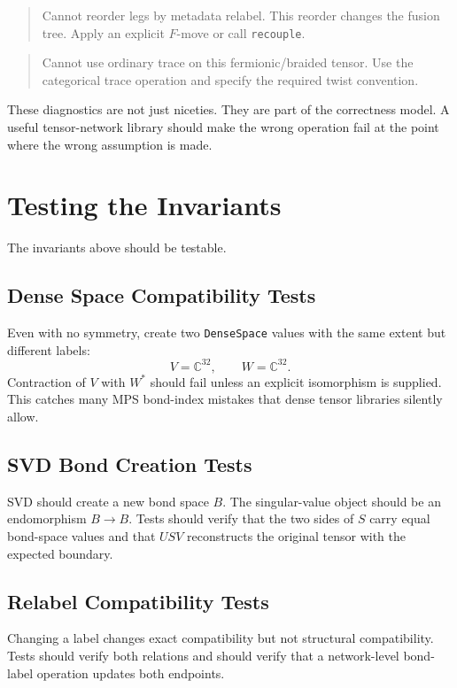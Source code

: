 \documentclass[11pt]{article}
\begin{document}
\begin{quote}
Cannot reorder legs by metadata relabel.  This reorder changes the
fusion tree.  Apply an explicit \(F\)-move or call \texttt{recouple}.
\end{quote}

\begin{quote}
Cannot use ordinary trace on this fermionic/braided tensor.  Use the
categorical trace operation and specify the required twist convention.
\end{quote}

These diagnostics are not just niceties.  They are part of the
correctness model.  A useful tensor-network library should make the
wrong operation fail at the point where the wrong assumption is made.

\section{Testing the Invariants}

The invariants above should be testable.

\subsection{Dense Space Compatibility Tests}

Even with no symmetry, create two \texttt{DenseSpace} values with the
same extent but different labels:
\[
  V = \mathbb{C}^{32}, \qquad W = \mathbb{C}^{32}.
\]
Contraction of \(V\) with \(W^\ast\) should fail unless an explicit
isomorphism is supplied.  This catches many MPS bond-index mistakes
that dense tensor libraries silently allow.

\subsection{SVD Bond Creation Tests}

SVD should create a new bond space \(B\).  The singular-value object
should be an endomorphism \(B \to B\).  Tests should verify that the
two sides of \(S\) carry equal bond-space values and that \(U S V\)
reconstructs the original tensor with the expected boundary.

\subsection{Relabel Compatibility Tests}

Changing a label changes exact compatibility but not structural
compatibility.  Tests should verify both relations and should verify
that a network-level bond-label operation updates both endpoints.
\end{document}
